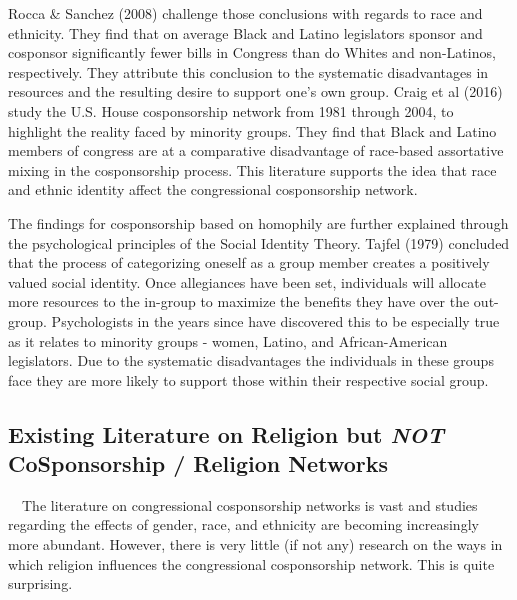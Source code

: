 \documentclass[Royal,times,sageh]{sagej}
\begin{document}
Rocca \& Sanchez (2008) challenge those conclusions with regards to race
and ethnicity. They find that on average Black and Latino legislators
sponsor and cosponsor significantly fewer bills in Congress than do
Whites and non-Latinos, respectively. They attribute this conclusion to
the systematic disadvantages in resources and the resulting desire to
support one's own group. Craig et al (2016) study the U.S. House
cosponsorship network from 1981 through 2004, to highlight the reality
faced by minority groups. They find that Black and Latino members of
congress are at a comparative disadvantage of race-based assortative
mixing in the cosponsorship process. This literature supports the idea
that race and ethnic identity affect the congressional cosponsorship
network.

The findings for cosponsorship based on homophily are further explained
through the psychological principles of the Social Identity Theory.
Tajfel (1979) concluded that the process of categorizing oneself as a
group member creates a positively valued social identity. Once
allegiances have been set, individuals will allocate more resources to
the in-group to maximize the benefits they have over the out-group.
Psychologists in the years since have discovered this to be especially
true as it relates to minority groups - women, Latino, and
African-American legislators. Due to the systematic disadvantages the
individuals in these groups face they are more likely to support those
within their respective social group.

\hypertarget{existing-literature-on-religion-but-not-cosponsorship-religion-networks}{%
\subsection{\texorpdfstring{Existing Literature on Religion but
\emph{NOT} CoSponsorship / Religion
Networks}{Existing Literature on Religion but NOT CoSponsorship / Religion Networks}}\label{existing-literature-on-religion-but-not-cosponsorship-religion-networks}}

~~The literature on congressional cosponsorship networks is vast and
studies regarding the effects of gender, race, and ethnicity are
becoming increasingly more abundant. However, there is very little (if
not any) research on the ways in which religion influences the
congressional cosponsorship network. This is quite surprising.
\end{document}
